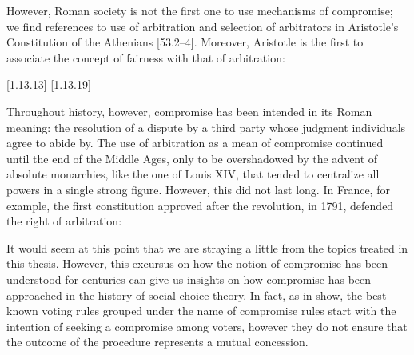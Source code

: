 However, Roman society is not the first one to use mechanisms of compromise; we find references to use of arbitration and selection of arbitrators in Aristotle’s Constitution of the Athenians [53.2–4]. %
Moreover, Aristotle is the first to associate the concept of fairness with that of arbitration:
%
\begin{displayquote}
\textit{}\citet{OnRhetoric}[1.13.13]
\textit{}\citet{OnRhetoric}[1.13.19]
\end{displayquote}
%
Throughout history, however, compromise has been intended in its Roman meaning: the resolution of a dispute by a third party whose judgment individuals agree to abide by.
The use of arbitration as a mean of compromise continued until the end of the Middle Ages, only to be overshadowed by the advent of absolute monarchies, like the one of Louis XIV, that tended to centralize all powers in a single strong figure\citep{Zappala2018}.
However, this did not last long. In France, for example, the first constitution approved after the revolution, in 1791, defended the right of arbitration:
%
\begin{displayquote}
\textit{}\citep{Constitution1791}
\end{displayquote}
%

It would seem at this point that we are straying a little from the topics treated in this thesis. However, this excursus on how the notion of compromise has been understood for centuries can give us insights on how compromise has been approached in the history of social choice theory. In fact, as  in  show, the best-known voting rules grouped under the name of compromise rules start with the intention of seeking a compromise among voters, however they do not ensure that the outcome of the procedure represents a mutual concession.

